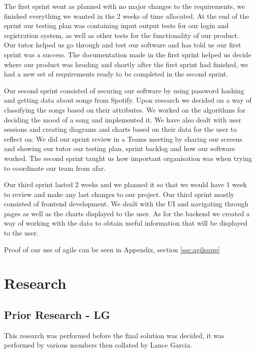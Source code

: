 \documentclass[10pt]{report}
\begin{document}
The first sprint went as planned with no major changes to the requirements, we finished everything we wanted in the 2 weeks of time allocated. At the end of the sprint our testing plan was containing input output tests for our login and registration system, as well as other tests for the functionality of our product. Our tutor helped us go through and test our software and has told us our first sprint was a success. The documentation made in the first sprint helped us decide where our product was heading and shortly after the first sprint had finished, we had a new set of requirements ready to be completed in the second sprint.

Our second sprint consisted of securing our software by using password hashing and getting data about songs from Spotify. Upon research we decided on a way of classifying the songs based on their attributes. We worked on the algorithms for deciding the mood of a song and implemented it. We have also dealt with user sessions and creating diagrams and charts based on their data for the user to reflect on. We did our sprint review in a Teams meeting by sharing our screens and showing our tutor our testing plan, sprint backlog and how our software worked. The second sprint taught us how important organisation was when trying to coordinate our team from afar.

Our third sprint lasted 2 weeks and we planned it so that we would have 1 week to review and make any last changes to our project. Our third sprint mostly consisted of frontend development. We dealt with the UI and navigating through pages as well as the charts displayed to the user. As for the backend we created a way of working with the data to obtain useful information that will be displayed to the user. 

Proof of our use of agile can be seen in Appendix, section \ref{sec:agileapp}

\chapter{Research}


\section{Prior Research - LG}
\label{res:prior}

This research was performed before the final solution was decided, it was performed by various members then collated by Lance Garcia.\newline
\end{document}

